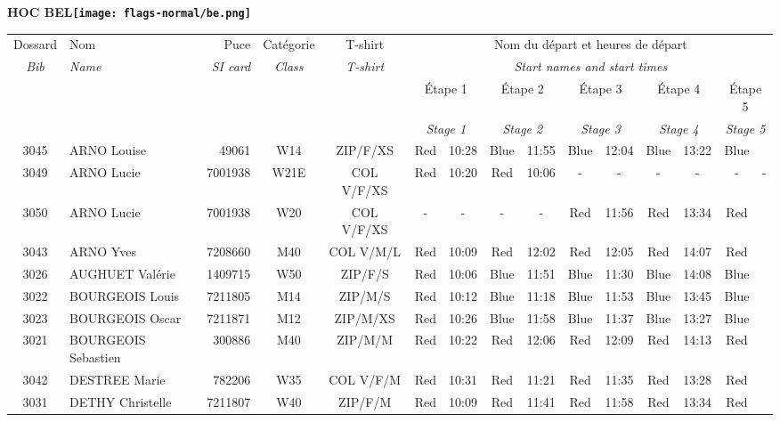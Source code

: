 \documentclass{report}
\begin{document}
\newpage
  \Huge \centering \bfseries HOC  BEL\normalfont \footnotesize \sffamily \hfill \texttt{[image: flags-normal/be.png]} \newline 
  \begin{longtable}{|c|l|r|c|c|*{5}{cc|}}
    Dossard & Nom  & Puce    & Catégorie & T-shirt & \multicolumn{10}{c|}{Nom du départ et heures de départ} \\
    \itshape Bib     & \itshape Name & \itshape SI card & \itshape Class  & \itshape  T-shirt  & \multicolumn{10}{c|}{\itshape Start names and start times} \\
    \hline
    & & & & & \multicolumn{2}{c|}{Étape 1} & \multicolumn{2}{c|}{Étape 2} & \multicolumn{2}{c|}{Étape 3} & \multicolumn{2}{c|}{Étape 4} & \multicolumn{2}{c|}{Étape 5} \\
    & & & & & \multicolumn{2}{c|}{\itshape Stage 1} & \multicolumn{2}{c|}{\itshape Stage 2} & \multicolumn{2}{c|}{\itshape Stage 3} & \multicolumn{2}{c|}{\itshape Stage 4} & \multicolumn{2}{c|}{\itshape Stage 5} \\
    \hline
    3045 & ARNO Louise & 49061 & W14 & ZIP/F/XS & Red & 10:28 & Blue & 11:55 & Blue & 12:04 & Blue & 13:22 & Blue &  \\
    3049 & ARNO Lucie & 7001938 & W21E & COL V/F/XS & Red & 10:20 & Red & 10:06 & - &  - & - &  - & - &  -\\
    3050 & ARNO Lucie & 7001938 & W20 & COL V/F/XS & - &  - & - &  - & Red & 11:56 & Red & 13:34 & Red &  \\
    3043 & ARNO Yves & 7208660 & M40 & COL V/M/L & Red & 10:09 & Red & 12:02 & Red & 12:05 & Red & 14:07 & Red &  \\
    3026 & AUGHUET Valérie & 1409715 & W50 & ZIP/F/S & Red & 10:06 & Blue & 11:51 & Blue & 11:30 & Blue & 14:08 & Blue &  \\
    3022 & BOURGEOIS Louis & 7211805 & M14 & ZIP/M/S & Red & 10:12 & Blue & 11:18 & Blue & 11:53 & Blue & 13:45 & Blue &  \\
    3023 & BOURGEOIS Oscar & 7211871 & M12 & ZIP/M/XS & Red & 10:26 & Blue & 11:58 & Blue & 11:37 & Blue & 13:27 & Blue &  \\
    3021 & BOURGEOIS Sebastien & 300886 & M40 & ZIP/M/M & Red & 10:22 & Red & 12:06 & Red & 12:09 & Red & 14:13 & Red &  \\
    3042 & DESTREE Marie & 782206 & W35 & COL V/F/M & Red & 10:31 & Red & 11:21 & Red & 11:35 & Red & 13:28 & Red &  \\
    3031 & DETHY Christelle & 7211807 & W40 & ZIP/F/M & Red & 10:09 & Red & 11:41 & Red & 11:58 & Red & 13:34 & Red &  \\

\end{longtable}
\end{document}
